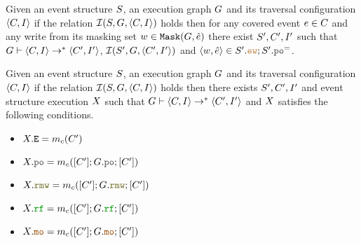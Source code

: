 \documentclass[12pt]{article}
\begin{document}
\begin{lemma}
  \label{lemma:2}
  Given an event structure $S$, an \imm execution graph $G$ 
  and its traversal configuration $\langle C, I \rangle$
  if the relation $\mathcal{I}(S, G, \langle C, I \rangle)$ holds
  then for any covered event $e \in C$ and any
  write from its masking set $w \in {\mathtt{Mask}}(G, \hat{e})$
  there exist $S', C', I'$ such that
  $G \vdash \langle C, I \rangle \rightarrow^* \langle C', I' \rangle$, 
  $\mathcal{I}(S', G, \langle C', I' \rangle)$
  and $\tup{w, \hat{e}} \in \lES'.\lEW;\lES'.\lPO^=$.
\end{lemma}

\begin{lemma}
  \label{lemma:3}
  Given an event structure $S$, an \imm execution graph $G$ 
  and its traversal configuration $\langle C, I \rangle$
  if the relation $\mathcal{I}(S, G, \langle C, I \rangle)$ holds
  then there exists $S', C', I'$ and event structure execution $X$ such that
  $G \vdash \langle C, I \rangle \rightarrow^* \langle C', I' \rangle$
  and $X$ satisfies the following conditions.
  \begin{itemize}
  \item $X.{\mathtt{E}} = m_{c}(C')$
  \item $\lX.\lPO = \lMC([\lC'];\lG.\lPO;[\lC'])$
  \item $\lX.\lRMW = \lMC([\lC'];\lG.\lRMW;[\lC'])$
  \item $\lX.\lRF = \lMC([\lC'];\lG.\lRF;[\lC'])$
  \item $\lX.\lMO = \lMC([\lC'];\lG.\lMO;[\lC'])$    
  \end{itemize}
\end{lemma}

\setmonofont[Mapping=tex-text]{CMU Typewriter Text}


\end{document}
